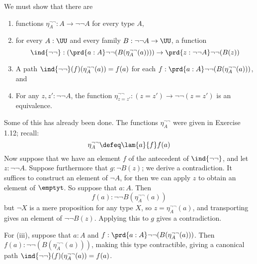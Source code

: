  \soln
We must show that there are
\begin{enumerate}
  \item functions $\eta^{\lnot \lnot}_{A} : A \to \lnot\lnot A$ for every type
  $A$,
  \item for every $A : \UU$ and every family $B : \lnot\lnot A \to \UU$, a
  function
  \[
    \ind{\lnot\lnot} : 
    \left(\prd{a : A}\lnot\lnot(B(\eta^{\lnot\lnot}_{A}(a)))\right)
    \to
    \prd{z : \lnot\lnot A}\lnot\lnot(B(z))
  \]
  \item A path $\ind{\lnot\lnot}(f)(\eta^{\lnot\lnot}_{A}(a)) = f(a)$ for each
  $f : \prd{a : A}\lnot\lnot(B(\eta^{\lnot\lnot}_{A}(a)))$, and
  \item For any $z, z' : \lnot \lnot A$, the function $\eta^{\lnot\lnot}_{z =
  z'} : (z = z') \to \lnot\lnot(z = z')$ is an equivalence.
\end{enumerate}
Some of this has already been done.  The functions $\eta^{\lnot\lnot}_{A}$ were
given in Exercise 1.12; recall:
\[
  \eta^{\lnot\lnot}_{A} \defeq \lam{a}{f}f(a)
\]
Now suppose that we have an element $f$ of the antecedent of
$\ind{\lnot\lnot}$, and let $z : \lnot\lnot A$.  Suppose furthermore
that $g : \lnot B(z)$; we derive a contradiction.  It suffices to
construct an element of $\lnot A$, for then we can apply $z$ to obtain
an element of $\emptyt$.  So suppose that $a : A$.  Then 
\[
  f(a) : \lnot \lnot B(\eta^{\lnot\lnot}_{A}(a))
\]
but $\lnot X$ is a mere proposition for any type $X$, so $z =
\eta^{\lnot\lnot}_{A}(a)$, and transporting gives an element of $\lnot \lnot
B(z)$.  Applying this to $g$ gives a contradiction.


For (iii), suppose that $a : A$ and $f : \prd{a :
A}\lnot\lnot(B(\eta^{\lnot\lnot}_{A}(a)))$.  Then $f(a) : \lnot \lnot
(B(\eta^{\lnot\lnot}_{A}(a)))$, making this type contractible, giving a
canonical path $\ind{\lnot\lnot}(f)(\eta^{\lnot\lnot}_{A}(a)) = f(a)$.


